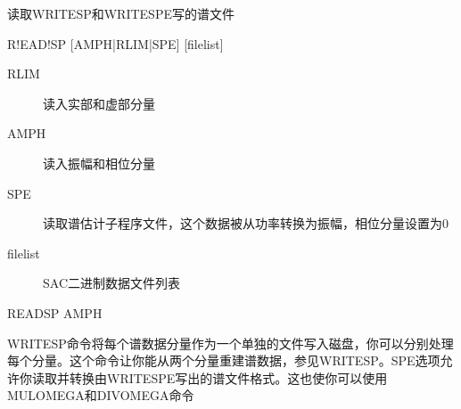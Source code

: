 \label{cmd:readsp}

读取WRITESP和WRITESPE写的谱文件

\begin{SACSTX}
R!EAD!SP [AMPH|RLIM|SPE] [filelist]
\end{SACSTX}

\begin{description}
\item [RLIM]  读入实部和虚部分量 
\item [AMPH]  读入振幅和相位分量 
\item [SPE] 读取谱估计子程序文件，这个数据被从功率转换为振幅，相位分量设置为0 
\item [filelist] SAC二进制数据文件列表 
\end{description}

\begin{SACDFT}
READSP AMPH
\end{SACDFT}

WRITESP命令将每个谱数据分量作为一个单独的文件写入磁盘，你可以分别处理每个分量。这个命令让你能从两个分量重建谱数据，参见WRITESP。SPE选项允许你读取并转换由WRITESPE写出的谱文件格式。这也使你可以使用MULOMEGA和DIVOMEGA命令

